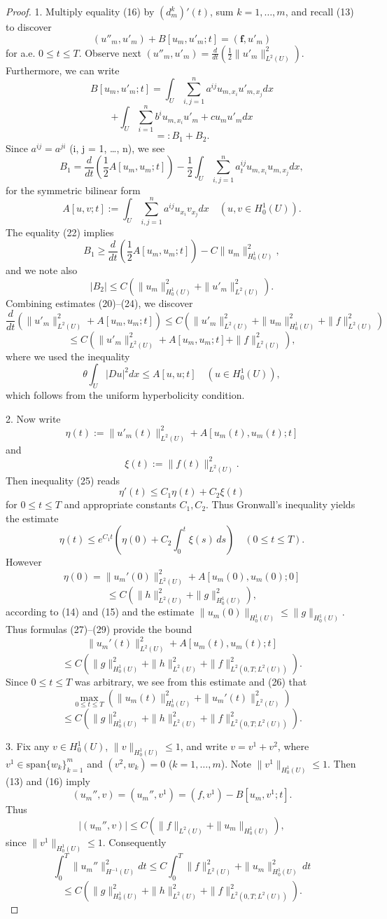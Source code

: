 \begin{proof}
1. Multiply equality (16) by $(d_m^k)'(t)$, sum $k = 1, \ldots, m$, and recall (13) to discover
\[
(u''_m, u'_m) + B[u_m, u'_m; t] = (\mathbf{f}, u'_m)
\tag{20}
\]
for a.e. $0 \le t \le T$. Observe next $(u''_m, u'_m) = \frac{d}{dt}(\frac{1}{2}\|u'_m\|^2_{L^2(U)})$. Furthermore, we can write
\[
B[u_m, u'_m; t] = \int_U \sum_{i,j=1}^{n} a^{ij}u_{m,x_i}u'_{m,x_j} dx
\]
\[
+ \int_U \sum_{i=1}^{n} b^i u_{m,x_i}u'_m + cu_mu'_m dx
\tag{21}
\]
\[
=: B_1 + B_2.
\]
Since $a^{ij} = a^{ji}$ (i, j = 1, \ldots, n), we see
\[
B_1 = \frac{d}{dt}\left(\frac{1}{2}A[u_m, u_m;t]\right) - \frac{1}{2}\int_U \sum_{i,j=1}^n a^{ij}_t u_{m,x_i} u_{m,x_j} dx,
\tag{22}
\]
for the symmetric bilinear form
\[
A[u, v; t] := \int_U \sum_{i,j=1}^n a^{ij} u_{x_i} v_{x_j} dx \quad (u, v \in H^1_0(U)).
\]
The equality (22) implies
\[
B_1 \geq \frac{d}{dt}\left(\frac{1}{2}A[u_m, u_m;t]\right) - C\|u_m\|^2_{H^1_0(U)},
\tag{23}
\]
and we note also
\[
|B_2| \leq C\left(\|u_m\|^2_{H^1_0(U)} + \|u'_m\|^2_{L^2(U)}\right).
\tag{24}
\]
Combining estimates (20)--(24), we discover
\[
\frac{d}{dt}\left(\|u'_m\|^2_{L^2(U)} + A[u_m, u_m; t]\right) \leq C\left(\|u'_m\|^2_{L^2(U)} + \|u_m\|^2_{H^1_0(U)} + \|f\|^2_{L^2(U)}\right)
\]
\[
\leq C\left(\|u'_m\|^2_{L^2(U)} + A[u_m, u_m; t] + \|f\|^2_{L^2(U)}\right),
\tag{25}
\]
where we used the inequality
\[
\theta \int_U |Du|^2 dx \leq A[u, u; t] \quad (u \in H^1_0(U)),
\tag{26}
\]
which follows from the uniform hyperbolicity condition.

2. Now write
\[
\eta(t) := \|u'_m(t)\|^2_{L^2(U)} + A[u_m(t), u_m(t); t]
\tag{27}
\]
and
\[
\xi(t) := \|f(t)\|^2_{L^2(U)}.
\tag{28}
\]
Then inequality (25) reads
\[
\eta'(t) \leq C_1 \eta(t) + C_2 \xi(t)
\]
for $0 \le t \le T$ and appropriate constants $C_1, C_2$. Thus Gronwall's inequality yields the estimate
\[
\eta(t) \le e^{C_1 t}\left(\eta(0) + C_2 \int_0^t \xi(s)\,ds\right) \quad (0 \le t \le T).
\tag{29}
\]
However
\[
\eta(0) = \|u_m'(0)\|^2_{L^2(U)} + A[u_m(0), u_m(0); 0]
\]
\[
\le C\left(\|h\|^2_{L^2(U)} + \|g\|^2_{H_0^1(U)}\right),
\]
according to (14) and (15) and the estimate $\|u_m(0)\|_{H_0^1(U)} \le \|g\|_{H_0^1(U)}$. Thus formulas (27)--(29) provide the bound
\[
\|u_m'(t)\|^2_{L^2(U)} + A[u_m(t), u_m(t); t]
\]
\[
\le C\left(\|g\|^2_{H_0^1(U)} + \|h\|^2_{L^2(U)} + \|f\|^2_{L^2(0,T;L^2(U))}\right).
\]
Since $0 \le t \le T$ was arbitrary, we see from this estimate and (26) that
\[
\max_{0 \le t \le T}\left(\|u_m(t)\|^2_{H_0^1(U)} + \|u_m'(t)\|^2_{L^2(U)}\right)
\]
\[
\le C\left(\|g\|^2_{H_0^1(U)} + \|h\|^2_{L^2(U)} + \|f\|^2_{L^2(0,T;L^2(U))}\right).
\]

3. Fix any $v \in H_0^1(U)$, $\|v\|_{H_0^1(U)} \le 1$, and write $v = v^1 + v^2$, where $v^1 \in \text{span}\{w_k\}_{k=1}^m$ and $(v^2, w_k) = 0$ ($k = 1, \ldots, m$). Note $\|v^1\|_{H_0^1(U)} \le 1$. Then (13) and (16) imply
\[
(u_m'', v) = (u_m'', v^1) = (f, v^1) - B[u_m, v^1; t].
\]
Thus
\[
|(u_m'', v)| \le C(\|f\|_{L^2(U)} + \|u_m\|_{H_0^1(U)}),
\]
since $\|v^1\|_{H_0^1(U)} \le 1$. Consequently
\[
\int_0^T \|u_m''\|^2_{H^{-1}(U)} dt \le C\int_0^T \|f\|^2_{L^2(U)} + \|u_m\|^2_{H_0^1(U)}\,dt
\]
\[
\le C\left(\|g\|^2_{H_0^1(U)} + \|h\|^2_{L^2(U)} + \|f\|^2_{L^2(0,T;L^2(U))}\right).
\]
\end{proof}

